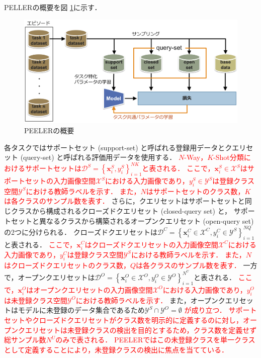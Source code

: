 \documentclass[a4paper,11pt,nomag]{jsreport}
\begin{document}
PELLERの概要を図 \ref{fig:peeler}に示す．
% 
\begin{figure}[tbp]
  \centering
  \includegraphics[width=\linewidth, keepaspectratio]{image/peeler.png}
  \caption{PEELERの概要}
  \label{fig:peeler}
\end{figure}
% 
各タスクではサポートセット (support-set) と呼ばれる登録用データとクエリセット (query-set) と呼ばれる評価用データを使用する．
\textcolor{red}{$N$-Way，$K$-Shot分類におけるサポートセットは$\mathcal{D}^S = \left\{ \bm{x}^S_i, y^S_i \right\}^{NK}_{i=1}$と表される．
ここで，$\bm{x}^S_i \in \mathcal{X}^S$はサポートセットの入力画像空間$\mathcal{X}^S$における入力画像であり，$y^S_i \in \mathcal{Y}^S$は登録クラス空間$\mathcal{Y}^S$における教師ラベルを示す．
また，$N$はサポートセットのクラス数，$K$は各クラスのサンプル数を表す．}
さらに，クエリセットはサポートセットと同じクラスから構成されるクローズドクエリセット (closed-query set) と，
サポートセットと異なるクラスから構築されるオープンクエリセット (open-query set) の2つに分けられる．
クローズドクエリセットは$\mathcal{D}^C = \left\{ \bm{x}^C_i \in \mathcal{X}^C, y^C_i \in \mathcal{Y}^S \right\}^{NQ}_{i=1}$と表される．
\textcolor{red}{ここで，$\bm{x}^C_i$はクローズドクエリセットの入力画像空間$\mathcal{X}^C$における入力画像であり，$y^C_i$は登録クラス空間$\mathcal{Y}^S$における教師ラベルを示す．
また，$N$はクローズドクエリセットのクラス数，$Q$は各クラスのサンプル数を表す．}
一方で，オープンクエリセットは$\mathcal{D}^O = \left\{ \bm{x}^O_i \in \mathcal{X}^O, y^O_i \in \mathcal{Y}^O \right\}^{N^U}_{i=1}$と表される．
\textcolor{red}{ここで，$\bm{x}^O_i$はオープンクエリセットの入力画像空間$\mathcal{X}^O$における入力画像であり，$y^O_i$は未登録クラス空間$\mathcal{Y}^O$における教師ラベルを示す．}
また，オープンクエリセットはモデルに未登録のデータ集合であるため$\mathcal{Y}^S \cap \mathcal{Y}^O = \emptyset$ \textcolor{red}{が成り立つ．}
\textcolor{red}{サポートセットやクローズドクエリセットがクラス数を明示的に定義するのに対し，オープンクエリセットは未登録クラスの検出を目的とするため，クラス数を定義せず総サンプル数$N^U$のみで表される．
PEELERではこの未登録クラスを単一クラスとして定義することにより，未登録クラスの検出に焦点を当てている．}
\end{document}
